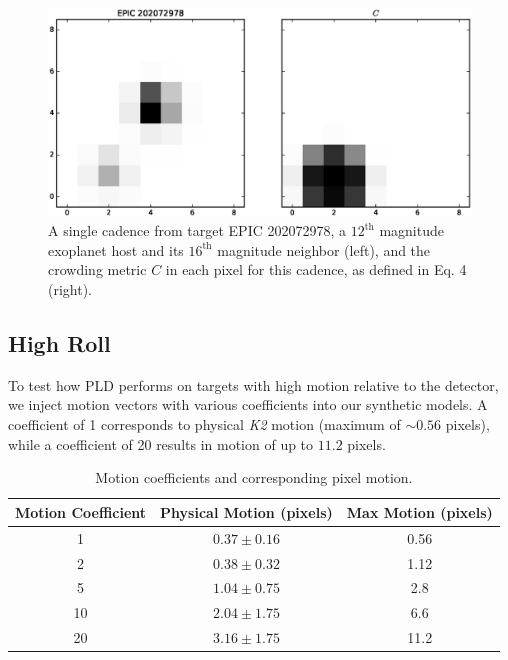 \documentclass[12pt,preprint]{aastex}
\begin{document}
\begin{figure}[h]
	\centering
	\includegraphics[width=1.0\linewidth]{cr.eps}
	\caption{A single cadence from target EPIC 202072978, a $12^{\text{th}}$ magnitude exoplanet host and its $16^{\text{th}}$ magnitude neighbor (left), and the crowding metric $C$ in each pixel for this cadence, as defined in Eq. 4 (right).}
	\label{fig:crowding}
\end{figure}

\subsection{High Roll}

To test how PLD performs on targets with high motion relative to the detector, we inject motion vectors with various coefficients into our synthetic models. A coefficient of 1 corresponds to physical \textit{K2} motion (maximum of $\sim 0.56$ pixels), while a coefficient of 20 results in motion of up to $11.2$ pixels.

\begin{table}[h!]
\begin{center}
    \begin{tabular}{c | c | c}
        Motion Coefficient & Physical Motion (pixels) & Max Motion (pixels) \\
        \hline \hline
        1 & $0.37\pm0.16$ & 0.56 \\
        2 & $0.38\pm0.32$ & 1.12 \\
				5 & $1.04\pm0.75$ & 2.8 \\
				10 & $2.04\pm1.75$ & 6.6 \\
				20 & $3.16\pm1.75$ & 11.2 \\
   \end{tabular}
	 \caption{Motion coefficients and corresponding pixel motion.}
	 \label{table:1}
\end{center}
\end{table}
\end{document}
